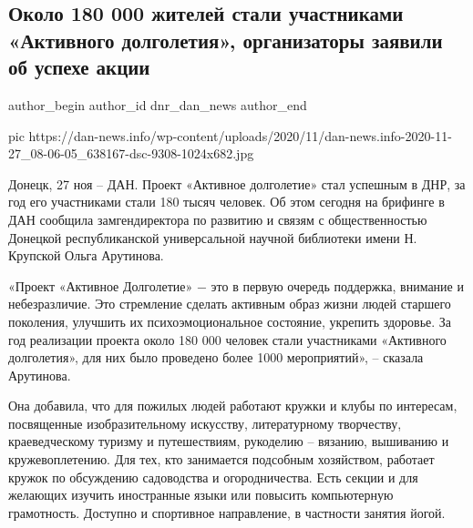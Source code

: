  
 
 
 
 
 
\subsection{Около 180 000 жителей стали участниками «Активного долголетия», организаторы заявили об успехе акции}
\label{sec:27_11_2020.news.dnr.dan.dnr_dan_news.1.aktivnoje_dolgoletie}
\ifcmt
	author_begin
   author_id dnr_dan_news
	author_end
\fi


\ifcmt
pic https://dan-news.info/wp-content/uploads/2020/11/dan-news.info-2020-11-27_08-06-05_638167-dsc-9308-1024x682.jpg
\fi

Донецк, 27 ноя – ДАН. Проект «Активное долголетие» стал успешным в ДНР, за год
его участниками стали 180 тысяч человек. Об этом сегодня на брифинге в ДАН
сообщила замгендиректора по развитию и связям с общественностью Донецкой
республиканской универсальной научной библиотеки имени Н. Крупской Ольга
Арутинова.

«Проект «Активное Долголетие» − это в первую очередь поддержка, внимание и
небезразличие. Это стремление сделать активным образ жизни людей старшего
поколения, улучшить их психоэмоциональное состояние, укрепить здоровье. За год
реализации проекта около 180 000 человек стали участниками «Активного
долголетия», для них было проведено более 1000 мероприятий», – сказала
Арутинова.

Она добавила, что для пожилых людей работают кружки и клубы по интересам,
посвященные изобразительному искусству, литературному творчеству,
краеведческому туризму и путешествиям, рукоделию – вязанию, вышиванию и
кружевоплетению. Для тех, кто занимается подсобным хозяйством, работает кружок
по обсуждению садоводства и огородничества. Есть секции и для желающих изучить
иностранные языки или повысить компьютерную грамотность. Доступно и спортивное
направление, в частности занятия йогой.

